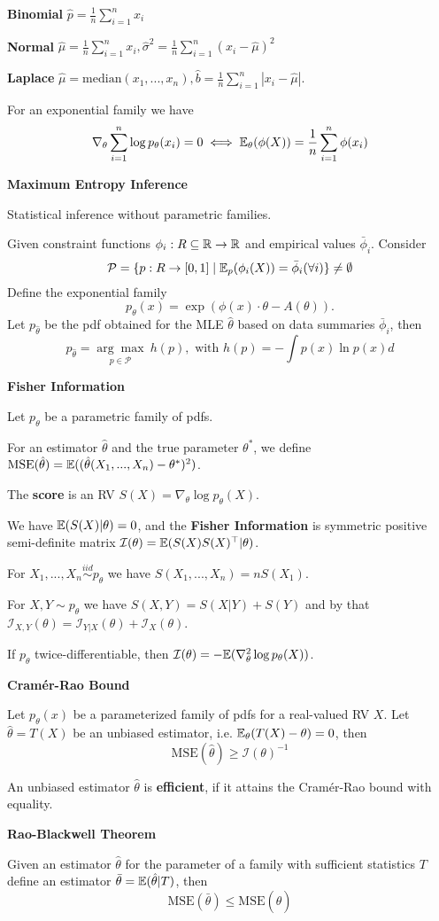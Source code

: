 \textbf{Binomial} \(\hat{p} = \frac{1}{n}\sum_{i = 1}^n x_i\)

\textbf{Normal} \(\hat{\mu} = \frac{1}{n}\sum_{i= 1}^n x_i, \hat{\sigma}^2 = \frac{1}{n}\sum_{i = 1}^n (x_i - \hat{\mu})^2\)


\textbf{Laplace} \(\hat{\mu} = \text{median}(x_1, ...,x_n), \hat{b} = \frac{1}{n}\sum_{i=1}^n|x_i-\hat{\mu}|\).


For an exponential family we have
\[\nabla_\theta \sum_{i = 1}^n \log p_\theta(x_i) = 0 \iff \mathbb{E}_\theta(\phi(X)) = \frac{1}{n}\sum_{i = 1}^n\phi(x_i)\]

\textbf{Maximum Entropy Inference}

Statistical inference without parametric families.

Given constraint functions \(\phi_i: R \subseteq \mathbb{R} \to \mathbb{R}\) and empirical values \(\bar{\phi}_i\). Consider
\[\mathcal{P} = \{p: R \to [0, 1] \mid \mathbb{E}_p(\phi_i(X)) = \bar{\phi}_i (\forall i) \}\neq \emptyset\]
Define the exponential family
\[p_{\theta}(x) = \exp(\phi(x)\cdot \theta - A(\theta)).\]
Let \(p_{\hat{\theta}}\) be the pdf obtained for the MLE \(\hat{\theta}\) based on data summaries 
\(\bar{\phi}_i\), then
\[p_{\hat{\theta}} = \underset{p \in \mathcal{P}}{\arg \max} \ h(p), \text{ with } h(p) = - \int p(x) \ln p(x) d\]

\textbf{Fisher Information}

Let \(p_\theta\) be a parametric family of pdfs. 

For an estimator \(\hat{\theta}\) and the true parameter \(\theta^*\), we define 
\(\text{MSE}(\hat{\theta}) = \mathbb{E}((\hat{\theta}(X_1, ..., X_n) - \theta^*)^2)\).

The \textbf{score} is an RV \(S(X) = \nabla_\theta \log p_\theta(X)\).

We have \(\mathbb{E}(S(X)|\theta) = 0\), and the \textbf{Fisher Information} is 
symmetric positive semi-definite matrix \(\mathcal{I}(\theta) = \mathbb{E}(S(X)S(X)^\top | \theta)\).

For \(X_1, ..., X_n \overset{iid}{\sim} p_{\theta}\) we have \(S(X_1, ...,X_n) = n S(X_1)\).

For \(X, Y \sim p_{\theta}\) we have \(S(X, Y) = S(X|Y)+S(Y)\) and by that 
\(\mathcal{I}_{X, Y}(\theta) = \mathcal{I}_{Y|X}(\theta) + \mathcal{I}_{X}(\theta)\).

If \(p_\theta\) twice-differentiable, then \(\mathcal{I}(\theta) = -\mathbb{E}(\nabla_\theta^2 \log p_\theta(X))\).

\textbf{Cramér-Rao Bound}

Let \(p_\theta(x)\) be a parameterized family of pdfs for a real-valued RV \(X\). 
Let \(\hat{\theta} = T(X)\) be an unbiased estimator, i.e. \(\mathbb{E}_\theta(T(X)- \theta) = 0\), then 
\[\text{MSE}(\hat{\theta}) \geq \mathcal{I}(\theta)^{-1}\]

An unbiased estimator \(\hat{\theta}\) is \textbf{efficient}, if it attains the Cramér-Rao bound with equality.

\textbf{Rao-Blackwell Theorem}

Given an estimator \(\hat{\theta}\) for the parameter of a family with sufficient statistics \(T\) define an estimator
\(\bar{\theta} = \mathbb{E}(\hat{\theta} | T)\), then 
\[\text{MSE}(\bar{\theta}) \leq \text{MSE}(\hat{\theta})\]